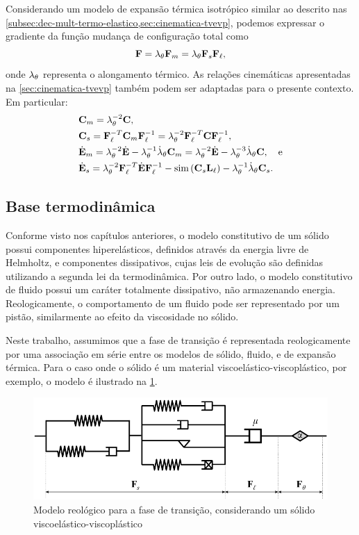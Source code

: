 \documentclass[Tese.tex]{subfiles}
\begin{document}
Considerando um modelo de expansão térmica isotrópico similar ao descrito nas \cref{subsec:dec-mult-termo-elastico,sec:cinematica-tvevp}, podemos expressar o gradiente da função mudança de configuração total como
\begin{equation}
\mathbf{F} = \lambda_{\theta}\mathbf{F}_m = \lambda_{\theta}\mathbf{F}_s\mathbf{F}_\ell,
\end{equation}
onde $\lambda_{\theta}$ representa o alongamento térmico. As relações cinemáticas apresentadas na \cref{sec:cinematica-tvevp} também podem ser adaptadas para o presente contexto. Em particular:
\begin{align}
&\mathbf{C}_m = \lambda_{\theta}^{-2}\mathbf{C}, \label{eq:Cm}\\
&\mathbf{C}_s = \mathbf{F}_\ell^{-T}\mathbf{C}_m\mathbf{F}_\ell^{-1} = \lambda_{\theta}^{-2}\mathbf{F}_\ell^{-T}\mathbf{C}\mathbf{F}_\ell^{-1}, \label{eq:Cs}\\
&\dot{\mathbf{E}}_m = \lambda_{\theta}^{-2}\dot{\mathbf{E}} - \lambda_{\theta}^{-1}\dot{\lambda}_{\theta}\mathbf{C}_m = \lambda_{\theta}^{-2}\dot{\mathbf{E}} - \lambda_{\theta}^{-3}\dot{\lambda}_{\theta}\mathbf{C}, \text{\quad e} \label{eq:dotEm}\\
&\dot{\mathbf{E}}_s = \lambda_{\theta}^{-2}\mathbf{F}_\ell^{-T}\dot{\mathbf{E}}\mathbf{F}_\ell^{-1} - \text{sim}\,(\mathbf{C}_s\mathbf{L}_\ell) - \lambda_{\theta}^{-1}\dot{\lambda}_{\theta}\mathbf{C}_s. \label{eq:dotEs}
\end{align}

\subsection{Base termodinâmica}

Conforme visto nos capítulos anteriores, o modelo constitutivo de um sólido possui componentes hiperelásticos, definidos através da energia livre de Helmholtz, e componentes dissipativos, cujas leis de evolução são definidas utilizando a segunda lei da termodinâmica. Por outro lado, o modelo constitutivo de fluido possui um caráter totalmente dissipativo, não armazenando energia. Reologicamente, o comportamento de um fluido pode ser representado por um pistão, similarmente ao efeito da viscosidade no sólido. 

Neste trabalho, assumimos que a fase de transição é representada reologicamente por uma associação em série entre os modelos de sólido, fluido, e de expansão térmica. Para o caso onde o sólido é um material viscoelástico-viscoplástico, por exemplo, o modelo é ilustrado na \cref{fig:phasechange-rheologic}.

\begin{figure}[!htb]
	\centering
	\caption{Modelo reológico para a fase de transição, considerando um sólido viscoelástico-viscoplástico}
	\label{fig:phasechange-rheologic}
	\includegraphics[scale=1]{Figuras/phasechange-rheologic.pdf}
\end{figure}
\end{document}
